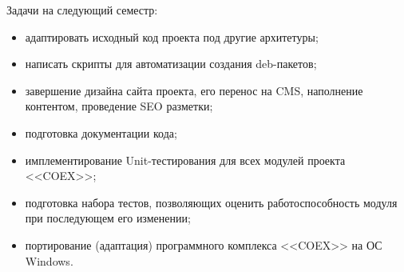 Задачи на следующий семестр:
\begin{itemize}
  \item адаптировать исходный код проекта под другие архитетуры;
  \item написать скрипты для автоматизации создания deb-пакетов; 
  \item завершение дизайна сайта проекта, его перенос на CMS, наполнение контентом, проведение SEO разметки;
  \item подготовка документации кода;
  \item имплементирование Unit-тестирования для всех модулей проекта <<COEX>>;
  \item подготовка набора тестов, позволяющих оценить работоспособность модуля при последующем его изменении;
  \item портирование (адаптация) программного комплекса <<COEX>> на ОС Windows.
\end{itemize}
